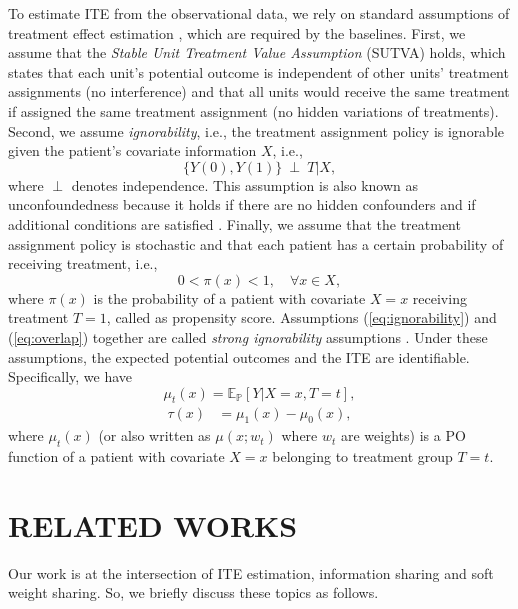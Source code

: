 \documentclass{article}
\begin{document}
To estimate ITE from the observational data, we rely on standard assumptions of treatment effect estimation \cite{imbens2015causal}, which are required by the baselines. First, we assume that the \textit{Stable Unit Treatment Value Assumption} (SUTVA) holds, which states that each unit's potential outcome is independent of other units' treatment assignments (no interference) and that all units would receive the same treatment if assigned the same treatment assignment (no hidden variations of treatments). Second, we assume \textit{ignorability}, i.e., the treatment assignment policy is ignorable given the patient's covariate information $X$, i.e.,
\begin{equation}
	\lbrace Y(0), Y(1) \rbrace~\perp~T \vert X,
	\label{eq:ignorability}
\end{equation}
where $\perp$ denotes independence. This assumption is also known as unconfoundedness because it holds if there are no hidden confounders and if additional conditions are satisfied \cite{rosenbaum1983central}. Finally, we assume that the treatment assignment policy is stochastic and that each patient has a certain probability of receiving treatment, i.e.,
\begin{equation}
	0 < \pi(x) < 1, \quad \forall x \in X,
	\label{eq:overlap}
\end{equation}
where $\pi(x)$ is the probability of a patient with covariate $X=x$ receiving treatment $T=1$, called as propensity score. Assumptions (\ref{eq:ignorability}) and (\ref{eq:overlap}) together are called \textit{strong ignorability} assumptions \cite{imbens2009recent}. Under these assumptions, the expected potential outcomes and the ITE are identifiable. Specifically, we have
\begin{equation}
	\label{eq_po}
	\mu_t(x) = \mathbb{E}_\mathbb{P} \left[ Y \vert X=x, T=t \right],
\end{equation}
\begin{equation}
	\label{eq_cate2}
	\begin{split}
		\tau(x) & = \mu_1(x) - \mu_0(x),
	\end{split}
\end{equation}
where $\mu_t(x)$ (or also written as $\mu(x;w_t)$ where $w_t$ are weights) is a PO function of a patient with covariate $X=x$ belonging to treatment group $T=t$.


\section{RELATED WORKS}
\label{sec_literature}
Our work is at the intersection of ITE estimation, information sharing and soft weight sharing. So, we briefly discuss these topics as follows.
\end{document}
